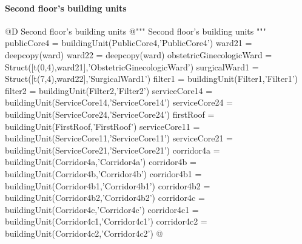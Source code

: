 \documentclass[11pt,oneside]{article}    %
\begin{document}
\paragraph{Second floor's building units}
@D Second floor's building units 
@{""" Second floor's building units """
publicCore4 = buildingUnit(PublicCore4,'PublicCore4')
ward21 = deepcopy(ward)
ward22 = deepcopy(ward)
obstetricGinecologicWard = Struct([t(0,4),ward21],'ObstetricGinecologicWard')
surgicalWard1 = Struct([t(7,4),ward22],'SurgicalWard1')
filter1 = buildingUnit(Filter1,'Filter1')
filter2 = buildingUnit(Filter2,'Filter2')
serviceCore14 = buildingUnit(ServiceCore14,'ServiceCore14')
serviceCore24 = buildingUnit(ServiceCore24,'ServiceCore24')
firstRoof = buildingUnit(FirstRoof,'FirstRoof')
serviceCore11 = buildingUnit(ServiceCore11,'ServiceCore11')
serviceCore21 = buildingUnit(ServiceCore21,'ServiceCore21')
corridor4a = buildingUnit(Corridor4a,'Corridor4a')
corridor4b = buildingUnit(Corridor4b,'Corridor4b')
corridor4b1 = buildingUnit(Corridor4b1,'Corridor4b1')
corridor4b2 = buildingUnit(Corridor4b2,'Corridor4b2')
corridor4c = buildingUnit(Corridor4c,'Corridor4c')
corridor4c1 = buildingUnit(Corridor4c1,'Corridor4c1')
corridor4c2 = buildingUnit(Corridor4c2,'Corridor4c2')
@}
\end{document}
